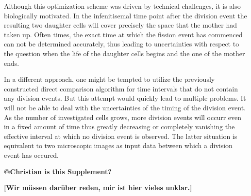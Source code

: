 \documentclass[10pt,letterpaper]{article}
\begin{document}
Although this optimization scheme was driven by technical challenges, it is also biologically
motivated.
In the infenitisemal time point after the division event the resulting two daughter cells will cover
precisely the space that the mother had taken up.
Often times, the exact time at which the fission event has commenced can not be determined
accurately, thus leading to uncertainties with respect to the question when the life of the daughter
cells begins and the one of the mother ends.

In a different approach, one might be tempted to utilize the previously constructed direct
comparison algorithm for time intervals that do not contain any division events.
But this attempt would quickly lead to multiple problems.
It will not be able to deal with the uncertainties of the timing of the division event.
As the number of investigated cells grows, more division events will occurr even in a fixed
amount of time thus greatly decreasing or completely vanishing the effective interval at which no
division event is observed.
The latter situation is equivalent to two microscopic images as input data between which a division
event has occured.

\textbf{@Christian is this Supplement?}

\textbf{[Wir müssen darüber reden, mir ist hier vieles unklar.]}
\end{document}
